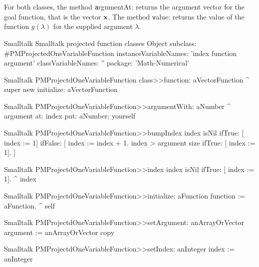 For both classes, the method {\texttt argumentAt:} returns the
argument vector for the goal function, that is the vector ${\textbf
x}$. The method {\texttt value:} returns the value of the function
$g\left(\lambda\right)$ for the supplied argument $\lambda$.

\begin{listing}[label=ls:projectedfunctions]{Smalltalk}
{Smalltalk projected function classes}
Object subclass: #PMProjectedOneVariableFunction
   instanceVariableNames: 'index function argument'
   classVariableNames: ''
   package: 'Math-Numerical'
\end{listing}

\begin{displaycode}{Smalltalk}
PMProjectdOneVariableFunction class>>function: aVectorFunction
    ^ super new initialize: aVectorFunction
\end{displaycode}

\begin{displaycode}{Smalltalk}
PMProjectdOneVariableFunction>>argumentWith: aNumber
    ^ argument at: index put: aNumber; yourself
\end{displaycode}

\begin{displaycode}{Smalltalk}
PMProjectdOneVariableFunction>>bumpIndex
    index isNil
        ifTrue: [ index := 1]
        ifFalse: [ index := index + 1.
                  index > argument size
                    ifTrue: [ index := 1].
                ]
\end{displaycode}

\begin{displaycode}{Smalltalk}
PMProjectdOneVariableFunction>>index
    index isNil
        ifTrue: [ index := 1].
    ^ index
\end{displaycode}

\begin{displaycode}{Smalltalk}
PMProjectdOneVariableFunction>>initialize: aFunction
    function := aFunction.
    ^ self
\end{displaycode}

\begin{displaycode}{Smalltalk}
PMProjectdOneVariableFunction>>setArgument: anArrayOrVector
    argument := anArrayOrVector copy
\end{displaycode}

\begin{displaycode}{Smalltalk}
PMProjectdOneVariableFunction>>setIndex: anInteger
    index := anInteger
\end{displaycode}

